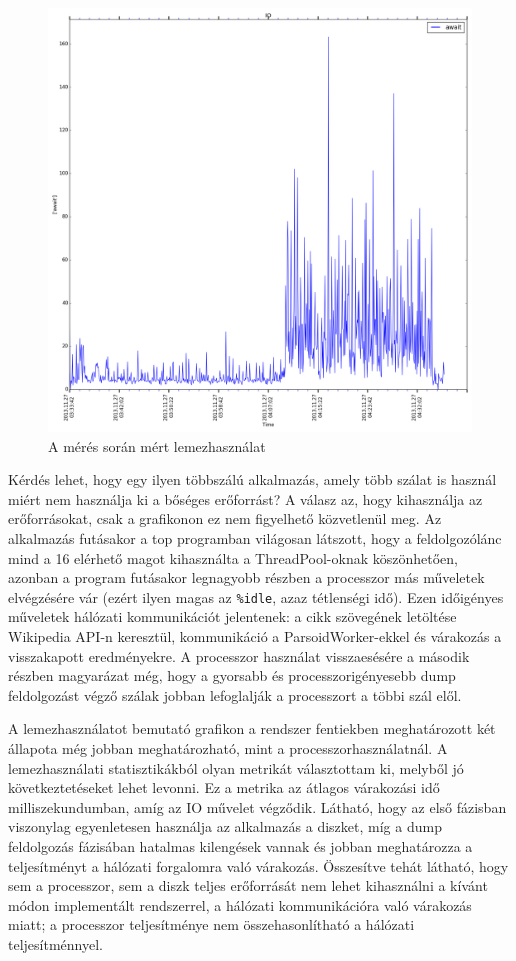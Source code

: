 \begin{figure}[htp]
\centering
\includegraphics[scale=0.3]{img/measurement_io}
\caption{A mérés során mért lemezhasználat}
\label{fig:measurement_io}
\end{figure}

Kérdés lehet, hogy egy ilyen többszálú alkalmazás, amely több szálat is használ miért nem használja ki a bőséges erőforrást? A válasz az, hogy kihasználja az erőforrásokat, csak a grafikonon ez nem figyelhető közvetlenül meg. Az alkalmazás futásakor a top programban világosan látszott, hogy a feldolgozólánc mind a 16 elérhető magot kihasználta a ThreadPool-oknak köszönhetően, azonban a program futásakor legnagyobb részben a processzor más műveletek elvégzésére vár (ezért ilyen magas az \texttt{\%idle}, azaz tétlenségi idő). Ezen időigényes műveletek hálózati kommunikációt jelentenek: a cikk szövegének letöltése Wikipedia API-n keresztül, kommunikáció a ParsoidWorker-ekkel és várakozás a visszakapott eredményekre. A processzor használat visszaesésére a második részben magyarázat még, hogy a gyorsabb és processzorigényesebb dump feldolgozást végző szálak jobban lefoglalják a processzort a többi szál elől.

A lemezhasználatot bemutató grafikon a rendszer fentiekben meghatározott két állapota még jobban meghatározható, mint a processzorhasználatnál. A lemezhasználati statisztikákból olyan metrikát választottam ki, melyből jó következtetéseket lehet levonni. Ez a metrika az átlagos várakozási idő milliszekundumban, amíg az IO művelet végződik. Látható, hogy az első fázisban viszonylag egyenletesen használja az alkalmazás a diszket, míg a dump feldolgozás fázisában hatalmas kilengések vannak és jobban meghatározza a teljesítményt a hálózati forgalomra való várakozás. Összesítve tehát látható, hogy sem a processzor, sem a diszk teljes erőforrását nem lehet kihasználni a kívánt módon implementált rendszerrel, a hálózati kommunikációra való várakozás miatt; a processzor teljesítménye nem összehasonlítható a hálózati teljesítménnyel.


